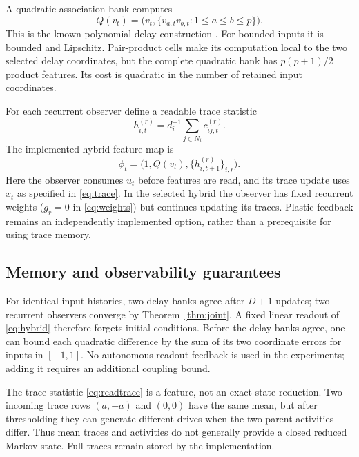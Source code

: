 \documentclass[11pt,a4paper]{article}
\theoremstyle{definition}\newtheorem{definition}[theorem]{Definition}
\begin{document}
A quadratic association bank computes
\begin{equation}
 Q(v_t)=\bigl(v_t,\{v_{a,t}v_{b,t}:1\leq a\leq b\leq p\}\bigr). \label{eq:quadratic}
\end{equation}
This is the known polynomial delay construction \cite{gauthier2021}. For bounded inputs it is bounded and Lipschitz. Pair-product cells make its computation local to the two selected delay coordinates, but the complete quadratic bank has $p(p+1)/2$ product features. Its cost is quadratic in the number of retained input coordinates.

For each recurrent observer define a readable trace statistic
\begin{equation}
 h^{(r)}_{i,t}=d_i^{-1}\sum_{j\in N_i}c^{(r)}_{ij,t}. \label{eq:readtrace}
\end{equation}
The implemented hybrid feature map is
\begin{equation}
 \phi_t=\bigl(1,Q(v_t),\{h^{(r)}_{i,t+1}\}_{i,r}\bigr). \label{eq:hybrid}
\end{equation}
Here the observer consumes $u_t$ before features are read, and its trace update uses $x_t$ as specified in \eqref{eq:trace}. In the selected hybrid the observer has fixed recurrent weights ($g_r=0$ in \eqref{eq:weights}) but continues updating its traces. Plastic feedback remains an independently implemented option, rather than a prerequisite for using trace memory.

\subsection{Memory and observability guarantees}
For identical input histories, two delay banks agree after $D+1$ updates; two recurrent observers converge by Theorem~\ref{thm:joint}. A fixed linear readout of \eqref{eq:hybrid} therefore forgets initial conditions. Before the delay banks agree, one can bound each quadratic difference by the sum of its two coordinate errors for inputs in $[-1,1]$. No autonomous readout feedback is used in the experiments; adding it requires an additional coupling bound.

The trace statistic \eqref{eq:readtrace} is a feature, not an exact state reduction. Two incoming trace rows $(a,-a)$ and $(0,0)$ have the same mean, but after thresholding they can generate different drives when the two parent activities differ. Thus mean traces and activities do not generally provide a closed reduced Markov state. Full traces remain stored by the implementation.
\end{document}
